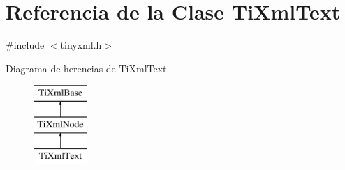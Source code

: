 \hypertarget{classTiXmlText}{\section{\-Referencia de la \-Clase \-Ti\-Xml\-Text}
\label{classTiXmlText}
}


{\ttfamily \#include $<$tinyxml.\-h$>$}

\-Diagrama de herencias de \-Ti\-Xml\-Text\begin{figure}[H]
\begin{center}
\leavevmode
\includegraphics[height=3.000000cm]{classTiXmlText}
\end{center}
\end{figure}
